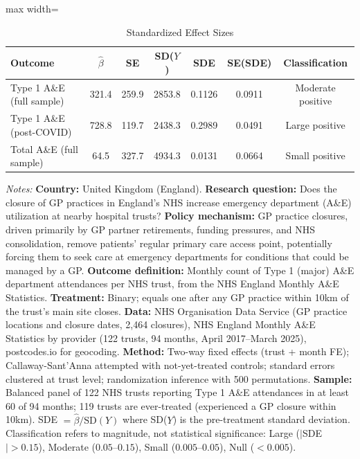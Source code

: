 \begin{table}[htbp]
\centering
\caption{Standardized Effect Sizes}
\label{tab:sde}
\begin{adjustbox}{max width=\textwidth}
\begin{tabular}{lcccccc}
\hline\hline
Outcome & $\hat{\beta}$ & SE & SD($Y$) & SDE & SE(SDE) & Classification \\
\hline
Type 1 A\&E (full sample) & 321.4 & 259.9 & 2853.8 & 0.1126 & 0.0911 & Moderate positive \\
Type 1 A\&E (post-COVID) & 728.8 & 119.7 & 2438.3 & 0.2989 & 0.0491 & Large positive \\
Total A\&E (full sample) & 64.5 & 327.7 & 4934.3 & 0.0131 & 0.0664 & Small positive \\
\hline\hline
\end{tabular}
\end{adjustbox}
\begin{tablenotes}[flushleft]
\footnotesize
\item \textit{Notes:} \textbf{Country:} United Kingdom (England). \textbf{Research question:} Does the closure of GP practices in England's NHS increase emergency department (A\&E) utilization at nearby hospital trusts? \textbf{Policy mechanism:} GP practice closures, driven primarily by GP partner retirements, funding pressures, and NHS consolidation, remove patients' regular primary care access point, potentially forcing them to seek care at emergency departments for conditions that could be managed by a GP. \textbf{Outcome definition:} Monthly count of Type 1 (major) A\&E department attendances per NHS trust, from the NHS England Monthly A\&E Statistics. \textbf{Treatment:} Binary; equals one after any GP practice within 10km of the trust's main site closes. \textbf{Data:} NHS Organisation Data Service (GP practice locations and closure dates, 2,464 closures), NHS England Monthly A\&E Statistics by provider (122 trusts, 94 months, April 2017--March 2025), postcodes.io for geocoding. \textbf{Method:} Two-way fixed effects (trust + month FE); Callaway-Sant'Anna attempted with not-yet-treated controls; standard errors clustered at trust level; randomization inference with 500 permutations. \textbf{Sample:} Balanced panel of 122 NHS trusts reporting Type 1 A\&E attendances in at least 60 of 94 months; 119 trusts are ever-treated (experienced a GP closure within 10km). SDE $= \hat{\beta} / \text{SD}(Y)$ where SD($Y$) is the pre-treatment standard deviation. Classification refers to magnitude, not statistical significance: Large ($|$SDE$| > 0.15$), Moderate ($0.05$--$0.15$), Small ($0.005$--$0.05$), Null ($< 0.005$).
\end{tablenotes}
\end{table}
